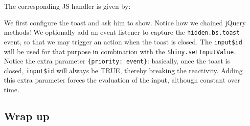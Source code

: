 \documentclass[]{book}
\newenvironment{Shaded}{\begin{snugshade}}{\end{snugshade}}
\newcommand{\AttributeTok}[1]{\textcolor[rgb]{0.77,0.63,0.00}{#1}}
\newcommand{\CommentTok}[1]{\textcolor[rgb]{0.56,0.35,0.01}{\textit{#1}}}
\newcommand{\DataTypeTok}[1]{\textcolor[rgb]{0.13,0.29,0.53}{#1}}
\newcommand{\KeywordTok}[1]{\textcolor[rgb]{0.13,0.29,0.53}{\textbf{#1}}}
\newcommand{\NormalTok}[1]{#1}
\newcommand{\OperatorTok}[1]{\textcolor[rgb]{0.81,0.36,0.00}{\textbf{#1}}}
\newcommand{\SpecialCharTok}[1]{\textcolor[rgb]{0.00,0.00,0.00}{#1}}
\newcommand{\StringTok}[1]{\textcolor[rgb]{0.31,0.60,0.02}{#1}}
\newcommand{\VariableTok}[1]{\textcolor[rgb]{0.00,0.00,0.00}{#1}}
\newcommand{\VerbatimStringTok}[1]{\textcolor[rgb]{0.31,0.60,0.02}{#1}}
\begin{document}
The corresponding JS handler is given by:

\begin{Shaded}
\end{Shaded}

We first configure the toast and ask him to show. Notice how we chained jQuery methods! We optionally add an event listener to capture the \texttt{hidden.bs.toast} event, so that we may trigger an action when the toast is closed. The \texttt{input\$id} will be used for that purpose in combination with the \texttt{Shiny.setInputValue}. Notice the extra parameter \texttt{\{priority:\ \textquotesingle{}event\textquotesingle{}\}}: basically, once the toast is closed, \texttt{input\$id} will always be TRUE, thereby breaking the reactivity. Adding this extra parameter forces the evaluation of the input, although constant over time.

\hypertarget{wrap-up}{%
\subsection{Wrap up}\label{wrap-up}}
\end{document}
